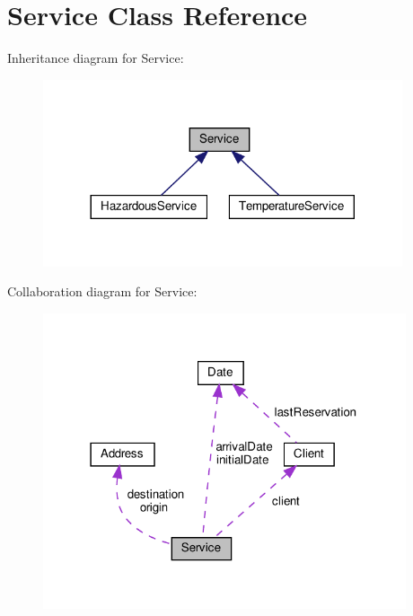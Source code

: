 \hypertarget{class_service}{}\section{Service Class Reference}
\label{class_service}


Inheritance diagram for Service\+:\nopagebreak
\begin{figure}[H]
\begin{center}
\leavevmode
\includegraphics[width=300pt]{class_service__inherit__graph}
\end{center}
\end{figure}


Collaboration diagram for Service\+:\nopagebreak
\begin{figure}[H]
\begin{center}
\leavevmode
\includegraphics[width=303pt]{class_service__coll__graph}
\end{center}
\end{figure}
